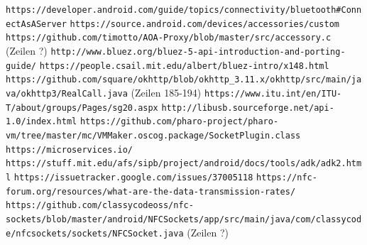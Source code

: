     \pagebreak
    
    \renewcommand\refname{Internetquellen}
    \begin{thebibliography}{9}
        \texttt{https://developer.android.com/guide/topics/\linebreak connectivity/bluetooth\#ConnectAsAServer}
        \texttt{https://source.android.com/devices/\linebreak accessories/custom}
        \texttt{https://github.com/timotto/AOA-Proxy/blob/\linebreak master/src/accessory.c} (Zeilen ?)
        \texttt{http://www.bluez.org/bluez-5-api-introduction-and-\linebreak porting-guide/}
        \texttt{https://people.csail.mit.edu/albert/bluez-intro/x148.html}
        \texttt{https://github.com/square/okhttp/blob/okhttp\_3.11.x/\linebreak okhttp/src/main/java/okhttp3/RealCall.java} (Zeilen 185-194)
        \texttt{https://www.itu.int/en/ITU-T/about/groups/Pages/sg20.aspx}
        \texttt{http://libusb.sourceforge.net/api-1.0/index.html}
        \texttt{https://github.com/pharo-project/pharo-vm/tree/\linebreak master/mc/VMMaker.oscog.package/SocketPlugin.class}
        \texttt{https://microservices.io/}
        \texttt{https://stuff.mit.edu/afs/sipb/project/android/docs/tools/\linebreak adk/adk2.html}
        \texttt{https://issuetracker.google.com/issues/37005118}
        \texttt{https://nfc-forum.org/resources/what-are-the-data-\linebreak transmission-rates/}
        \texttt{https://github.com/classycodeoss/nfc-sockets/blob/\linebreak master/android/NFCSockets/app/src/main/java/com/classycode/\linebreak nfcsockets/sockets/NFCSocket.java} (Zeilen ?)

\end{thebibliography}
